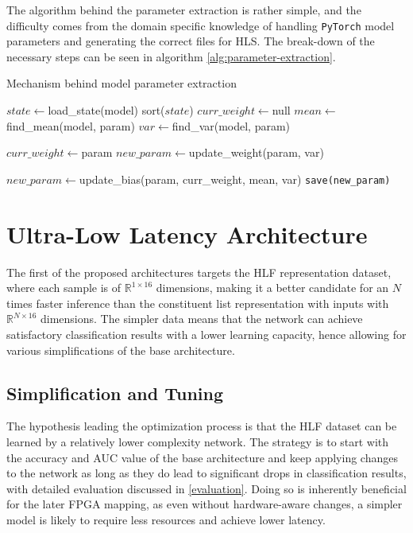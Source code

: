 The algorithm behind the parameter extraction is rather simple, and the difficulty comes from the domain specific knowledge of handling \texttt{PyTorch} model parameters and generating the correct files for HLS. The break-down of the necessary steps can be seen in algorithm \ref{alg:parameter-extraction}.

\begin{algorithm}
  \caption{Mechanism behind model parameter extraction}\label{alg:parameter-extraction}
  \begin{algorithmic}[1]
    \State $state \gets $load\_state(model)
    \State sort($state$)
    \State $curr\_weight \gets $null
      \State $mean \gets $find\_mean(model, param)
      \State $var \gets $find\_var(model, param)

        \State $curr\_weight \gets $param
        \State $new\_param \gets $update\_weight(param, var)

      \Else
        
        \State $new\_param \gets $update\_bias(param, curr\_weight, mean, var)
      \EndIf
      \State \texttt{save(new\_param)}
    \EndFor
  \end{algorithmic}
\end{algorithm}



\section{Ultra-Low Latency Architecture}
The first of the proposed architectures targets the HLF representation dataset, where each sample is of \(\mathbb{R}^{1 \times 16}\) dimensions, making it a better candidate for an \(N\) times faster inference than the constituent list representation with inputs with \(\mathbb{R}^{N \times 16}\) dimensions. The simpler data means that the network can achieve satisfactory classification results with a lower learning capacity, hence allowing for various simplifications of the base architecture.

\subsection{Simplification and Tuning}
The hypothesis leading the optimization process is that the HLF dataset can be learned by a relatively lower complexity network. The strategy is to start with the accuracy and AUC value of the base architecture and keep applying changes to the network as long as they do lead to significant drops in classification results, with detailed evaluation discussed in 
\cref{evaluation}. Doing so is inherently beneficial for the later FPGA mapping, as even without hardware-aware changes, a simpler model is likely to require less resources and achieve lower latency.


